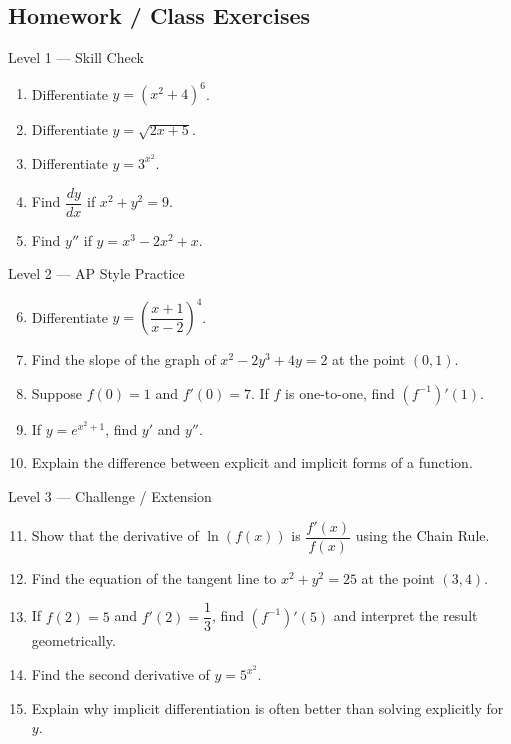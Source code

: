 \documentclass[11pt]{article}
\begin{document}
\newpage
\subsection{Homework / Class Exercises}

\begin{practicebox}{Level 1 --- Skill Check}
\begin{enumerate}
    \item Differentiate $y=(x^2+4)^6$.
    \item Differentiate $y=\sqrt{2x+5}$.
    \item Differentiate $y=3^{x^2}$.
    \item Find $\dfrac{dy}{dx}$ if $x^2+y^2=9$.
    \item Find $y''$ if $y=x^3-2x^2+x$.
\end{enumerate}
\end{practicebox}

\begin{practicebox}{Level 2 --- AP Style Practice}
\begin{enumerate}
    \setcounter{enumi}{5}
    \item Differentiate $y=\left(\dfrac{x+1}{x-2}\right)^4$.
    \item Find the slope of the graph of $x^2-2y^3+4y=2$ at the point $(0,1)$.
    \item Suppose $f(0)=1$ and $f'(0)=7$. If $f$ is one-to-one, find $(f^{-1})'(1)$.
    \item If $y=e^{x^2+1}$, find $y'$ and $y''$.
    \item Explain the difference between explicit and implicit forms of a function.
\end{enumerate}
\end{practicebox}

\begin{practicebox}{Level 3 --- Challenge / Extension}
\begin{enumerate}
    \setcounter{enumi}{10}
    \item Show that the derivative of $\ln(f(x))$ is $\dfrac{f'(x)}{f(x)}$ using the Chain Rule.
    \item Find the equation of the tangent line to $x^2+y^2=25$ at the point $(3,4)$.
    \item If $f(2)=5$ and $f'(2)=\dfrac13$, find $(f^{-1})'(5)$ and interpret the result geometrically.
    \item Find the second derivative of $y=5^{x^2}$.
    \item Explain why implicit differentiation is often better than solving explicitly for $y$.
\end{enumerate}
\end{practicebox}
\end{document}
